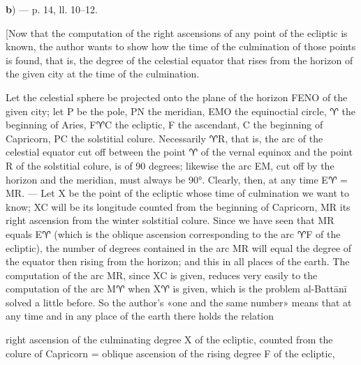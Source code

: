 \documentclass[11pt]{article}
\newcommand{\Pg}[1]{\marginpar{\footnotesize\color{gray}#1}}
\begin{document}
\par\begin{center}\textbf{b}) — p. 14, ll. 10–12.\end{center}
\par [Now that the computation of the right ascensions of any point of the ecliptic is known, the author wants to show how the time of the culmination of those points is found, that is, the degree of the celestial equator that rises from the horizon of the given city at the time of the culmination.\par
\begin{center}\end{center}
\par \Pg{I 164}Let the celestial sphere be projected onto the plane of the horizon FENO of the given city; let P be the pole, PN the meridian, EMO the equinoctial circle, {\MoonFont\upshape ♈} the beginning of Aries, F{\MoonFont\upshape ♈}C the ecliptic, F the ascendant, C the beginning of Capricorn, PC the solstitial colure. Necessarily {\MoonFont\upshape ♈}R, that is, the arc of the celestial equator cut off between the point {\MoonFont\upshape ♈} of the vernal equinox and the point R of the solstitial colure, is of 90 degrees; likewise the arc EM, cut off by the horizon and the meridian, must always be 90°. Clearly, then, at any time E{\MoonFont\upshape ♈} = MR. — Let X be the point of the ecliptic whose time of culmination we want to know; XC will be its longitude counted from the beginning of Capricorn, MR its right ascension from the winter solstitial colure. Since we have seen that MR equals E{\MoonFont\upshape ♈} (which is the oblique ascension corresponding to the arc {\MoonFont\upshape ♈}F of the ecliptic), the number of degrees contained in the arc MR will equal the degree of the equator then rising from the horizon; and this in all places of the earth. The computation of the arc MR, since XC is given, reduces very easily to the computation of the arc M{\MoonFont\upshape ♈} when X{\MoonFont\upshape ♈} is given, which is the problem al-Battānī solved a little before. So the author's «one and the same number» means that at any time and in any place of the earth there holds the relation\par
\par\begin{center}right ascension of the culminating degree X of the ecliptic, counted from the colure of Capricorn = oblique ascension of the rising degree F of the ecliptic,\end{center}
\end{document}
